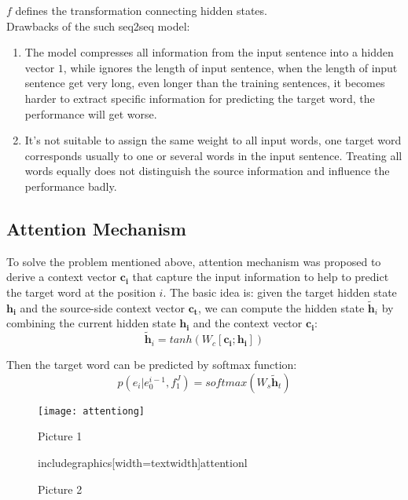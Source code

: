  $f$ defines the transformation connecting hidden states.  \\








%
%

Drawbacks of the such seq2seq model:
\begin{enumerate}
	\item The model compresses all information from the input sentence into a hidden vector ${1}$, while ignores the length of input sentence, when the length of input sentence get very long, even longer than the training sentences, it becomes harder to extract specific information for predicting the target word, the performance will get worse.
	\item It's not suitable to assign the same weight to all input words, one target word corresponds usually to one or several words in the input sentence. Treating all words equally does not distinguish the source information and influence the performance badly.
\end{enumerate}

\subsection{Attention Mechanism}
To solve the problem mentioned above, attention mechanism was proposed to derive a context vector ${\bm{c_i}}$ that capture the input information to help to predict the target word at the position ${i}$. The basic idea is: given the target hidden state ${\bm{h_i}}$ and the source-side context vector $\bm{c_t}$, we can compute the hidden state ${\tilde{\bm{h}}_i}$ by combining the current hidden state $\bm{h_i}$ and the context vector $\bm{c_i}$:
\[ \tilde{\bm{h}}_i = tanh(W_c[\bm{c_i}; \bm{h_i}])\]

Then the target word can be predicted by softmax function:
\[  p(e_i|e_0^{i-1}, f_1^J) = softmax(W_s \tilde{\bm{h}}_t)\] 
\begin{figure}
	\begin{minipage}[h]{0.5\textwidth}
		\texttt{[image: attentiong]}
		\caption{Picture 1}
		\label{fig:1}
	\end{minipage}
	
	\begin{minipage}[h]{0.5\textwidth}
		includegraphics[width=textwidth]{attentionl}
		\caption{Picture 2}
		\label{fig:2}
	\end{minipage}
\end{figure}

